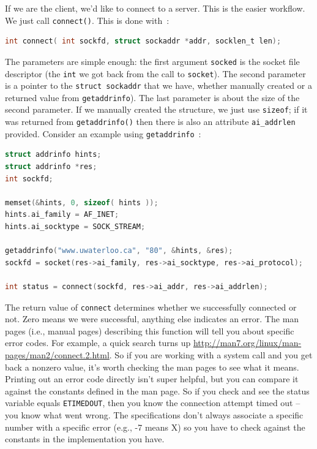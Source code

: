 If we are the client, we'd like to connect to a server. This is the easier workflow. We just call \texttt{connect()}. This is done with~\cite{apunix}:

\begin{lstlisting}[language=C]
int connect( int sockfd, struct sockaddr *addr, socklen_t len); 
\end{lstlisting}

The parameters are simple enough: the first argument \texttt{socked} is the socket file descriptor (the \texttt{int} we got back from the call to \texttt{socket}). The second parameter is a pointer to the \texttt{struct sockaddr} that we have, whether manually created or a returned value from \texttt{getaddrinfo}). The last parameter is about the size of the second parameter. If we manually created the structure, we just use \texttt{sizeof}; if it was returned from \texttt{getaddrinfo()} then there is also an attribute \texttt{ai\_addrlen} provided. Consider an example using \texttt{getaddrinfo}~\cite{getaddrinfo}:

\begin{lstlisting}[language=C]
struct addrinfo hints;
struct addrinfo *res;
int sockfd;

memset(&hints, 0, sizeof( hints ));
hints.ai_family = AF_INET;
hints.ai_socktype = SOCK_STREAM;

getaddrinfo("www.uwaterloo.ca", "80", &hints, &res);
sockfd = socket(res->ai_family, res->ai_socktype, res->ai_protocol);

int status = connect(sockfd, res->ai_addr, res->ai_addrlen);
\end{lstlisting}

The return value of \texttt{connect} determines whether we successfully connected or not. Zero means we were successful, anything else indicates an error. The man pages (i.e., manual pages) describing this function will tell you about specific error codes. For example, a quick search turns up \url{http://man7.org/linux/man-pages/man2/connect.2.html}. So if you are working with a system call and you get back a nonzero value, it's worth checking the man pages to see what it means. Printing out an error code directly isn't super helpful, but you can compare it against the constants defined in the man page. So if you check and see the status variable equals \texttt{ETIMEDOUT}, then you know the connection attempt timed out -- you know what went wrong. The specifications don't always associate a specific number with a specific error (e.g., -7 means X) so you have to check against the constants in the implementation you have.

